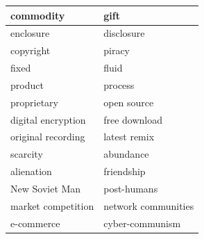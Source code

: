 \documentclass[letterpaper,12pt,english]{sphinxmanual}
\begin{document}
\begin{tabulary}{\linewidth}{|L|L|}
\hline

commodity
 & 
gift
\\
\hline
enclosure
 & 
disclosure
\\
\hline
copyright
 & 
piracy
\\
\hline
fixed
 & 
fluid
\\
\hline
product
 & 
process
\\
\hline
proprietary
 & 
open source
\\
\hline
digital encryption
 & 
free download
\\
\hline
original recording
 & 
latest remix
\\
\hline
scarcity
 & 
abundance
\\
\hline
alienation
 & 
friendship
\\
\hline
New Soviet Man
 & 
post-humans
\\
\hline
market competition
 & 
network communities
\\
\hline
e-commerce
 & 
cyber-communism
\\
\hline\end{tabulary}
\end{document}
